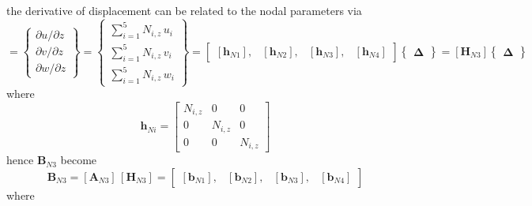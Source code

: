 the derivative of displacement can be related to the nodal parameters via
\begin{equation}
[\boldsymbol{\theta}_{N3}] =  \begin{Bmatrix}
\partial u / \partial z\\
\partial v / \partial z \\
\partial w / \partial z
\end{Bmatrix}
= \begin{Bmatrix}
\sum\nolimits_{i=1}^5 N_{i,z} \, u_i\\
\sum\nolimits_{i=1}^5 N_{i,z} \, v_i \\
\sum\nolimits_{i=1}^5 N_{i,z} \, w_i
\end{Bmatrix} 
= \begin{bmatrix}
[\mathbf{h}_{N1}], & [\mathbf{h}_{N2}], & [\mathbf{h}_{N3}], & [\mathbf{h}_{N4}] 
\end{bmatrix}  \begin{Bmatrix} \boldsymbol{\Delta} \end{Bmatrix}  
= [\mathbf{H}_{N3}] \begin{Bmatrix} \boldsymbol{\Delta} \end{Bmatrix} 
\end{equation}
where 
\begin{equation}
\mathbf{h}_{Ni} = \begin{bmatrix}
N_{i,z} &  0 & 0  \\
0 & N_{i,z} & 0  \\
0 & 0 & N_{i,z} \end{bmatrix} 
\end{equation}
hence $\mathbf{B}_{N3}$ become
\begin{equation}
\mathbf{B}_{N3} = [\mathbf{A}_{N3}] \, [\mathbf{H}_{N3}] = \begin{bmatrix}
[\mathbf{b}_{N1}], & [\mathbf{b}_{N2}], & [\mathbf{b}_{N3}], & [\mathbf{b}_{N4}]
\end{bmatrix} 
\end{equation}
where
